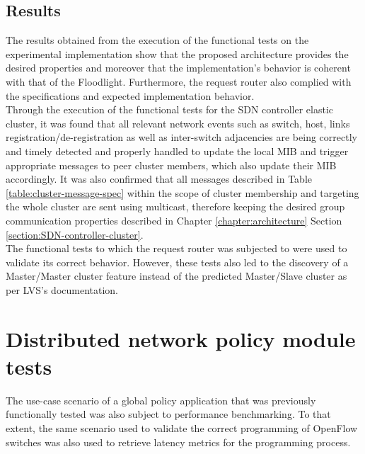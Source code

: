 \subsection{Results}
\label{section:functional-tests-results}
%
The results obtained from the execution of the functional tests on the experimental implementation show that the proposed architecture provides the desired properties and moreover that the implementation's behavior is coherent with that of the Floodlight.
Furthermore, the request router also complied with the specifications and expected implementation behavior.\\
%
Through the execution of the functional tests for the \gls{SDN} controller elastic cluster, it was found that all relevant network events such as switch, host, links registration/de-registration as well as inter-switch adjacencies are being correctly and timely detected and properly handled to update the local \gls{MIB} and trigger appropriate messages to peer cluster members, which also update their \gls{MIB} accordingly.
It was also confirmed that all messages described in Table \ref{table:cluster-message-spec} within the scope of cluster membership and targeting the whole cluster are sent using multicast, therefore keeping the desired group communication properties described in Chapter \ref*{chapter:architecture} Section \ref{section:SDN-controller-cluster}.\\
%
The functional tests to which the request router was subjected to were used to validate its correct behavior.
However, these tests also led to the discovery of a Master/Master cluster feature instead of the predicted Master/Slave cluster as per \gls{LVS}'s documentation.
%
\section{Distributed network policy module tests}
\label{section:performance-tests}
The use-case scenario of a global policy application that was previously functionally tested was also subject to performance benchmarking.
To that extent, the same scenario used to validate the correct programming of OpenFlow switches was also used to retrieve latency metrics for the programming process.
%
